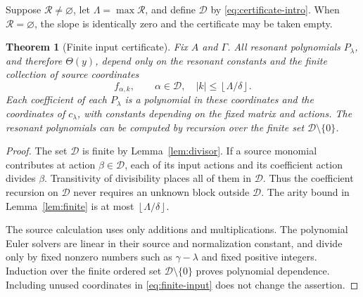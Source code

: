 \documentclass[11pt,a4paper]{article}
\numberwithin{equation}{section}
\newtheorem{theorem}{Theorem}[section]
\theoremstyle{definition}
\theoremstyle{remark}
\newcommand{\G}{\Gamma}
\newcommand{\Reson}{\mathcal R}
\newcommand{\floor}[1]{\left\lfloor #1\right\rfloor}
\begin{document}
Suppose \(\Reson\ne\varnothing\), let
\(\Lambda=\max\Reson\), and define \(\mathcal D\) by
\eqref{eq:certificate-intro}. When \(\Reson=\varnothing\), the slope
is identically zero and the certificate may be taken empty.

\begin{theorem}[Finite input certificate]\label{thm:certificate}
Fix \(A\) and \(\G\). All resonant polynomials \(P_\lambda\), and
therefore \(\Theta(y)\), depend only on the resonant constants and the
finite collection of source coordinates
\begin{equation}\label{eq:finite-input}
 f_{\alpha,k},\qquad
 \alpha\in\mathcal D,\quad |k|\le\floor{\Lambda/\delta}.
\end{equation}
Each coefficient of each \(P_\lambda\) is a polynomial in these
coordinates and the coordinates of \(c_\lambda\), with constants
depending on the fixed matrix and actions. The resonant polynomials can
be computed by recursion over the finite set \(\mathcal D\setminus\{0\}\).
\end{theorem}
\begin{proof}
The set \(\mathcal D\) is finite by Lemma~\ref{lem:divisor}. If a
source monomial contributes at action \(\beta\in\mathcal D\), each
of its input actions and its coefficient action divides \(\beta\).
Transitivity of divisibility places all of them in \(\mathcal D\).
Thus the coefficient recursion on \(\mathcal D\) never requires an
unknown block outside \(\mathcal D\). The arity bound in
Lemma~\ref{lem:finite} is at most \(\floor{\Lambda/\delta}\).

The source calculation uses only additions and multiplications. The
polynomial Euler solvers are linear in their source and normalization
constant, and divide only by fixed nonzero numbers such as
\(\gamma-\lambda\) and fixed positive integers. Induction over the
finite ordered set \(\mathcal D\setminus\{0\}\) proves polynomial
dependence. Including unused coordinates in \eqref{eq:finite-input}
does not change the assertion.
\end{proof}
\end{document}
